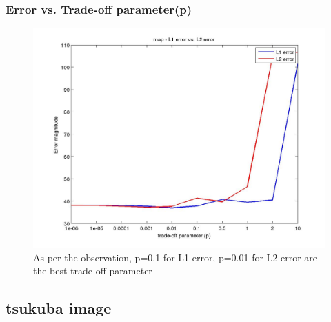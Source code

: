 \documentclass[fleqn]{article}
\begin{document}
\subsubsection{Error vs. Trade-off parameter(p)}
 \begin{figure}[!ht]
\includegraphics[scale=0.3]{./pics/_error_vs_tradeoffparams.jpg}
\caption{As per the observation, p=0.1 for L1 error, p=0.01 for L2 error are the best trade-off parameter}
\end{figure}

\clearpage
\subsection{tsukuba image}
\end{document}
